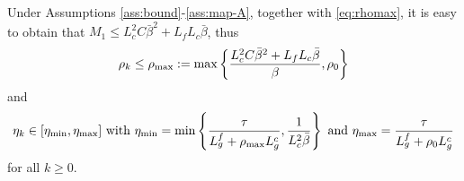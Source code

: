 \documentclass[11pt]{article}
\begin{document}
Under Assumptions \ref{ass:bound}-\ref{ass:map-A}, together with \eqref{eq:rhomax}, it is easy to obtain that $M_1\le L_c^2C\bar\beta^2 + L_fL_c \bar\beta$, thus 
\begin{align}\label{rhomax}\rho_k \leq \rho_{\rm max}:=\max \left\{\frac{L_c^2C\bar\beta^2 + L_fL_c \bar\beta}{\beta},\rho_0\right\}
\end{align} 
and 
\begin{align}\label{bound-eta}
 \eta_k \in [\eta_{\rm min}, \eta_{\rm max}]  \mbox{ with }  \eta_{\rm min} = \min \left\{\frac{\tau}{L_g^f + \rho_{\rm max} L_g^c}, {\frac{1}{L_c^2\bar\beta}}\right\} ~{\rm and}~\eta_{\rm max} = \frac{\tau}{L_g^f + \rho_0 L_g^c}
\end{align}
for all $k\ge0.$
\end{document}
